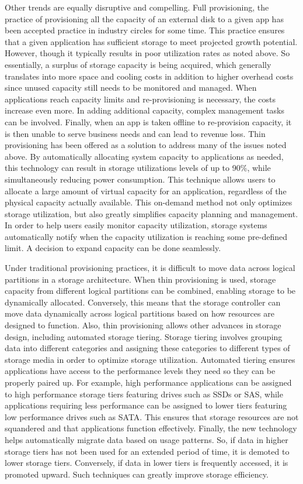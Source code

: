 \documentclass[11pt]{article}
\begin{document}
Other trends are equally disruptive and compelling. Full provisioning,
the practice of provisioning all the capacity of an external disk to a
given app has been accepted practice in industry circles for some
time. This practice ensures that a given application has sufficient
storage to meet projected growth potential. However, though it
typically results in poor utilization rates as noted above. So
essentially, a surplus of storage capacity is being acquired, which
generally translates into more space and cooling costs in addition to
higher overhead costs since unused capacity still needs to be
monitored and managed. When applications reach capacity limits and
re-provisioning is necessary, the costs increase even more. In adding
additional capacity, complex management tasks can be
involved. Finally, when an app is taken offline to re-provision
capacity, it is then unable to serve business needs and can lead to
revenue loss. Thin provisioning has been offered as a solution to
address many of the issues noted above. By automatically allocating
system capacity to applications as needed, this technology can result
in storage utilizations levels of up to 90\%, while simultaneously
reducing power consumption. This technique allows users to allocate a
large amount of virtual capacity for an application, regardless of the
physical capacity actually available. This on-demand method not only
optimizes storage utilization, but also greatly simplifies capacity
planning and management. In order to help users easily monitor
capacity utilization, storage systems automatically notify when the
capacity utilization is reaching some pre-defined limit. A decision to
expand capacity can be done seamlessly.

Under traditional provisioning practices, it is difficult to move data
across logical partitions in a storage architecture. When thin
provisioning is used, storage capacity from different logical
partitions can be combined, enabling storage to be dynamically
allocated. Conversely, this means that the storage controller can move
data dynamically across logical partitions based on how resources are
designed to function. Also, thin provisioning allows other advances in
storage design, including automated storage tiering. Storage tiering
involves grouping data into different categories and assigning these
categories to different types of storage media in order to optimize
storage utilization. Automated tiering ensures applications have
access to the performance levels they need so they can be properly
paired up. For example, high performance applications can be assigned
to high performance storage tiers featuring drives such as SSDs or
SAS, while applications requiring less performance can be assigned to
lower tiers featuring low performance drives such as SATA. This
ensures that storage resources are not squandered and that
applications function effectively. Finally, the new technology helps
automatically migrate data based on usage patterns. So, if data in
higher storage tiers has not been used for an extended period of time,
it is demoted to lower storage tiers. Conversely, if data in lower
tiers is frequently accessed, it is promoted upward. Such techniques
can greatly improve storage efficiency.
\end{document}
